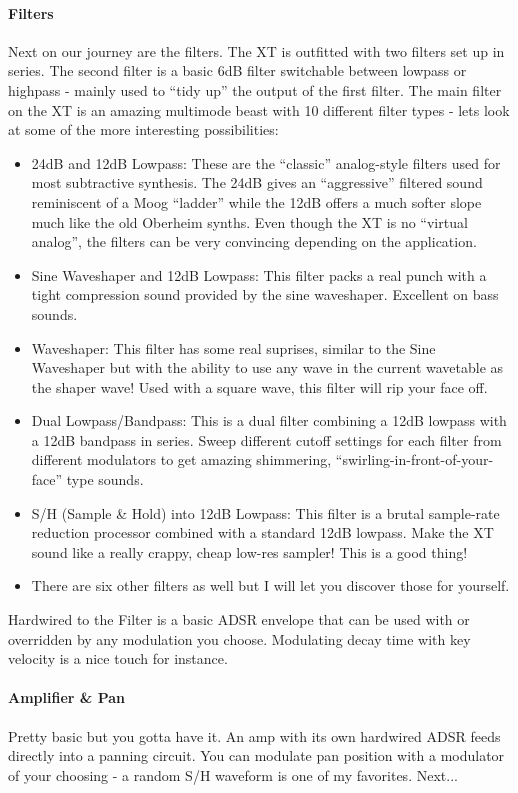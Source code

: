 \paragraph{Filters}
Next on our journey are the filters. The XT is outfitted with two filters set up in series. The second filter is a basic 6dB filter switchable between lowpass or highpass - mainly used to ``tidy up'' the output of the first filter. The main filter on the XT is an amazing multimode beast with 10 different filter types - lets look at some of the more interesting possibilities:
\begin{itemize}
	\item 24dB and 12dB Lowpass: These are the ``classic'' analog-style filters used for most subtractive synthesis. The 24dB gives an ``aggressive'' filtered sound reminiscent of a Moog ``ladder'' while the 12dB offers a much softer slope much like the old Oberheim synths. Even though the XT is no ``virtual analog'', the filters can be very convincing depending on the application. 
	\item Sine Waveshaper and 12dB Lowpass: This filter packs a real punch with a tight compression sound provided by the sine waveshaper. Excellent on bass sounds.
	\item Waveshaper: This filter has some real suprises, similar to the Sine Waveshaper but with the ability to use any wave in the current wavetable as the shaper wave! Used with a square wave, this filter will rip your face off.
	\item Dual Lowpass/Bandpass: This is a dual filter combining a 12dB lowpass with a 12dB bandpass in series. Sweep different cutoff settings for each filter from different modulators to get amazing shimmering, ``swirling-in-front-of-your-face'' type sounds.
	\item S/H (Sample \& Hold) into 12dB Lowpass: This filter is a brutal sample-rate reduction processor combined with a standard 12dB lowpass. Make the XT sound like a really crappy, cheap low-res sampler! This is a good thing!
	\item There are six other filters as well but I will let you discover those for yourself.
\end{itemize}
Hardwired to the Filter is a basic ADSR envelope that can be used with or overridden by any modulation you choose. Modulating decay time with key velocity is a nice touch for instance.
\paragraph{Amplifier \& Pan}
Pretty basic but you gotta have it. An amp with its own hardwired ADSR feeds directly into a panning circuit. You can modulate pan position with a modulator of your choosing - a random S/H waveform is one of my favorites. Next...
